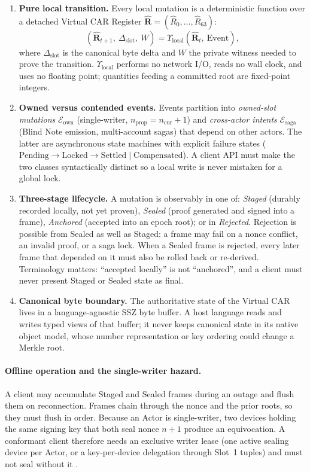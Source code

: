 \documentclass[a4paper,11pt,twoside,parskip=half-,headings=small]{scrartcl}
\begin{document}
\begin{enumerate}
  \item \textbf{Pure local transition.} Every local mutation is a deterministic function over a detached Virtual CAR Register $\widehat{\mathbf{R}}=(\hat R_0,\dots,\hat R_{63})$:
  \begin{equation}
    (\widehat{\mathbf{R}}_{t+1},\ \Delta_{\text{slot}},\ W)=\Upsilon_{\text{local}}(\widehat{\mathbf{R}}_t,\ \text{Event}),
  \end{equation}
  where $\Delta_{\text{slot}}$ is the canonical byte delta and $W$ the private witness needed to prove the transition. $\Upsilon_{\text{local}}$ performs no network I/O, reads no wall clock, and uses no floating point; quantities feeding a committed root are fixed-point integers.
  \item \textbf{Owned versus contended events.} Events partition into \emph{owned-slot mutations} $\mathcal E_{\text{own}}$ (single-writer, $n_{\text{prop}}=n_{\text{cur}}+1$) and \emph{cross-actor intents} $\mathcal E_{\text{saga}}$ (Blind Note emission, multi-account sagas) that depend on other actors. The latter are asynchronous state machines with explicit failure states ($\text{Pending}\to\text{Locked}\to\text{Settled}\mid\text{Compensated}$). A client API must make the two classes syntactically distinct so a local write is never mistaken for a global lock.
  \item \textbf{Three-stage lifecycle.} A mutation is observably in one of: \emph{Staged} (durably recorded locally, not yet proven), \emph{Sealed} (proof generated and signed into a  frame), \emph{Anchored} (accepted into an epoch root); or in \emph{Rejected}. Rejection is possible from Sealed as well as Staged: a frame may fail on a nonce conflict, an invalid proof, or a saga lock. When a Sealed frame is rejected, every later frame that depended on it must also be rolled back or re-derived. Terminology matters: ``accepted locally'' is not ``anchored'', and a client must never present Staged or Sealed state as final.
  \item \textbf{Canonical byte boundary.} The authoritative state of the Virtual CAR lives in a language-agnostic SSZ byte buffer. A host language reads and writes typed views of that buffer; it never keeps canonical state in its native object model, whose number representation or key ordering could change a Merkle root.
\end{enumerate}

\paragraph{Offline operation and the single-writer hazard.} A client may accumulate Staged and Sealed frames during an outage and flush them on reconnection. Frames chain through the nonce and the prior roots, so they must flush in order. Because an Actor is single-writer, two devices holding the same signing key that both seal nonce $n+1$ produce an equivocation. A conformant client therefore needs an exclusive writer lease (one active sealing device per Actor, or a key-per-device delegation through Slot~1 tuples) and must not seal without it .
\end{document}
